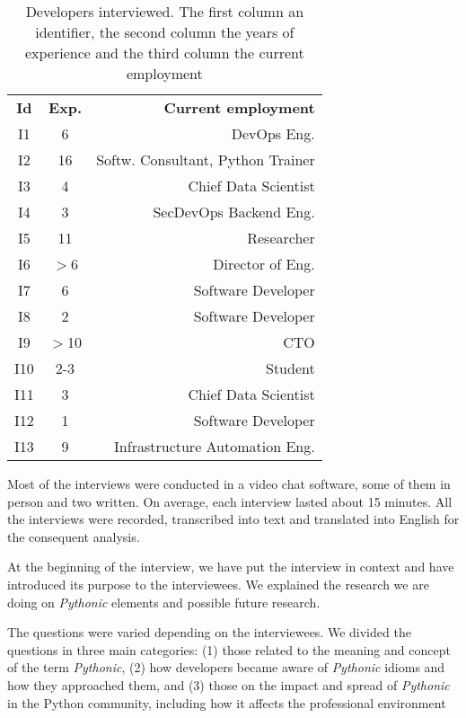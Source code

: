 \documentclass[a4paper]{article}
\begin{document}
\begin{table}
    \centering
    \begin{tabular}{c c r}
        
        \textbf{Id} & \textbf{Exp.} & \textbf{Current employment} \\
        
        I1 &  6 & DevOps Eng. \\
        I2 & 16 & Softw. Consultant, Python Trainer \\
        I3 &  4 & Chief Data Scientist \\
        I4 &  3 & SecDevOps Backend Eng. \\
        I5 & 11 & Researcher \\
        I6 & $>$6 & Director of Eng. \\
        I7 &  6 & Software Developer \\
        I8 &  2  & Software Developer \\
        I9 & $>$10 & CTO \\
        I10 & 2-3 & Student \\
        I11 & 3 & Chief Data Scientist \\
        I12 & 1 & Software Developer \\
        I13 & 9 & Infrastructure Automation Eng. \\ 
    \end{tabular}
    \caption{Developers interviewed. The first column an identifier, the second column the years of experience and the third column the current employment}
    \label{tab:interviewees}
\end{table}

Most of the interviews were conducted in a video chat software, some of them in person and two written. On average, each interview lasted about 15 minutes. All the interviews were recorded, transcribed into text and translated into English for the consequent analysis.

At the beginning of the interview, we have put the interview in context and have introduced its purpose to the interviewees. We explained the research we are doing on \textit{Pythonic} elements and possible future research.

The questions were varied depending on the interviewees. We divided the questions in three main categories: (1) those related to
the meaning and concept of the term \textit{Pythonic}, (2) how developers became aware of \textit{Pythonic} idioms and how they approached them, and (3) those on the impact and spread of \textit{Pythonic} in the Python community, including how it affects the professional environment
\end{document}
